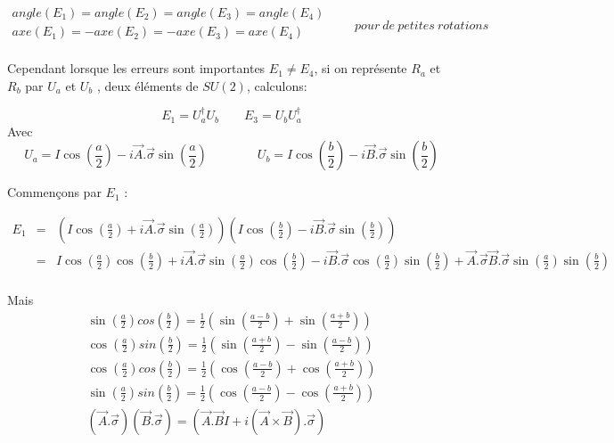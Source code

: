\documentclass[12pt,a4paper]{article}
\begin{document}
\[
\boxed{\begin{array}{c}
angle(E_1)=angle(E_2)=angle(E_3)=angle(E_4)\\
axe(E_1)=-axe(E_2)=-axe(E_3)=axe(E_4)\\
\end{array}
\qquad pour\ de\ petites\ rotations}
\]

Cependant lorsque les erreurs sont importantes $E_1\ne E_4$, si on représente $R_a$ et $R_b$ par $U_a$ et $U_b$ , deux éléments de $SU(2)$, calculons:

\[
E_1=U_a^\dagger U_b \qquad E_3= U_b U_a^\dagger
\]
Avec 
\[
U_a = I \cos\left(\frac{a}{2}\right)-i \vec{A}.\vec{\sigma} \sin\left(\frac{a}{2}\right)\qquad\qquad
U_b = I \cos\left(\frac{b}{2}\right)-i \vec{B}.\vec{\sigma} \sin\left(\frac{b}{2}\right)
\]

Commençons par $E_1$ :

\begin{eqnarray*}
E_1&=&\left( I \cos\left(\frac{a}{2}\right)+i \vec{A}.\vec{\sigma} \sin\left(\frac{a}{2}\right) \right)\left( I \cos\left(\frac{b}{2}\right)-i \vec{B}.\vec{\sigma} \sin\left(\frac{b}{2}\right) \right)\\
&=& I \cos\left(\frac{a}{2}\right)\cos\left(\frac{b}{2}\right)+i \vec{A}.\vec{\sigma} \sin\left(\frac{a}{2}\right)\cos\left(\frac{b}{2}\right)  -i  \vec{B}.\vec{\sigma} \cos\left(\frac{a}{2}\right)\sin\left(\frac{b}{2}\right)+ \vec{A}.\vec{\sigma}\vec{B}.\vec{\sigma} \sin\left(\frac{a}{2}\right)\sin\left(\frac{b}{2}\right) \\
\end{eqnarray*}

Mais 
\[
\begin{array}{l}
\sin(\frac{a}{2})cos(\frac{b}{2})=\frac{1}{2}\left(\sin\left(\frac{a-b}{2}\right)+\sin\left(\frac{a+b}{2}\right)\right)\\
\cos(\frac{a}{2})sin(\frac{b}{2})=\frac{1}{2}\left(\sin\left(\frac{a+b}{2}\right)-\sin\left(\frac{a-b}{2}\right)\right)\\
\cos(\frac{a}{2})cos(\frac{b}{2})=\frac{1}{2}\left(\cos\left(\frac{a-b}{2}\right)+\cos\left(\frac{a+b}{2}\right)\right)\\
\sin(\frac{a}{2})sin(\frac{b}{2})=\frac{1}{2}\left(\cos\left(\frac{a-b}{2}\right)-\cos\left(\frac{a+b}{2}\right)\right)\\
(\vec{A}.\vec{\sigma}) (\vec{B}.\vec{\sigma}) = \left(\vec{A}.\vec{B} I + i(\vec{A}\times\vec{B}).\vec{\sigma}\right)\\
\end{array}
\]
\end{document}
